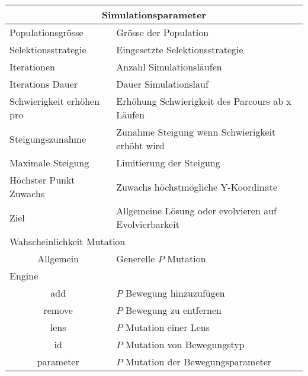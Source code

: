 
    \begin{tabular}{ | l | l | }
      \hline
      \multicolumn{2}{|c|}{Simulationsparameter} \\
      \hline
      Populationsgrösse & Grösse der Population \\ \hline
      Selektionsstrategie & Eingesetzte Selektionsstrategie \\ \hline
      Iterationen & Anzahl Simulationsläufen \\ \hline
      Iterations Dauer & Dauer Simulationslauf \\ \hline
      Schwierigkeit erhöhen pro & Erhöhung Schwierigkeit des Parcours ab x Läufen \\ \hline
      Steigungszunahme & Zunahme Steigung wenn Schwierigkeit erhöht wird\\ \hline
      Maximale Steigung & Limitierung der Steigung\\ \hline
      Höchster Punkt Zuwachs & Zuwachs höchstmögliche Y-Koordinate \\ \hline
      Ziel & Allgemeine Lösung oder evolvieren auf Evolvierbarkeit \\ \hline
      \multicolumn{2}{|l|}{Wahscheinlichkeit Mutation}\\ \hline
      \multicolumn{1}{|c|}{Allgemein} & Generelle \(P\) Mutation \\ \hline
      Engine &  \\ \hline
      \multicolumn{1}{|c|}{add} & \(P\) Bewegung hinzuzufügen \\ \hline
      \multicolumn{1}{|c|}{remove} & \(P\) Bewegung zu entfernen \\ \hline
      \multicolumn{1}{|c|}{lens} & \(P\) Mutation einer Lens \\ \hline
      \multicolumn{1}{|c|}{id} & \(P\) Mutation von Bewegungstyp\\ \hline
      \multicolumn{1}{|c|}{parameter} & \(P\) Mutation der Bewegungsparameter \\ \hline
    \end{tabular}

